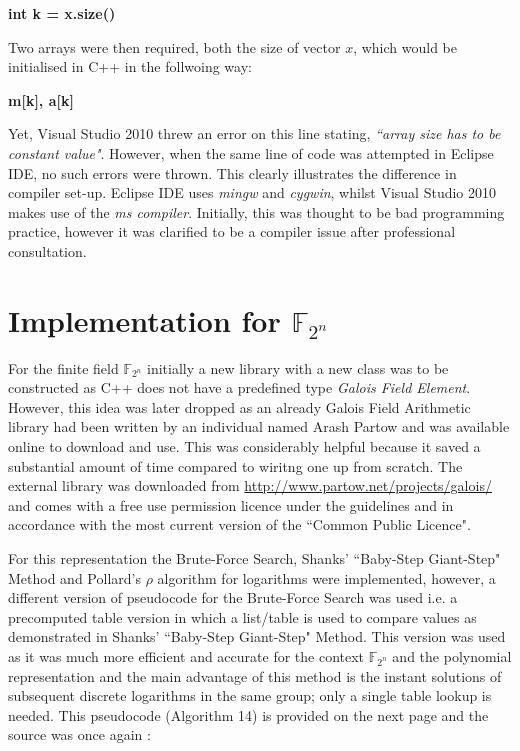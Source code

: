 \documentclass[iwp,first]{luthesis}
\begin{document}
\begin{center}

\textbf{int k = x.size()}

\end{center}

Two arrays were then required, both the size of vector $x$, which would be initialised in C++ in the follwoing way:

\begin{center}

\textbf{m[k], a[k]}

\end{center}

Yet, Visual Studio 2010 threw an error on this line stating, \textit{``array size has to be constant value"}. However, when the same line of code was attempted in Eclipse IDE, no such errors were thrown. This clearly illustrates the difference in compiler set-up. Eclipse IDE uses \textit{mingw} and \textit{cygwin}, whilst Visual Studio 2010 makes use of the \textit{ms compiler}. Initially, this was thought to be bad programming practice, however it was clarified to be a compiler issue after professional consultation.




\section{Implementation for $\mathbb{F}_{2^n}$}

For the finite field $\mathbb{F}_{2^n}$ initially a new library with a new class was to be constructed as C++ does not have a predefined type \textit{Galois Field Element}. However, this idea was later dropped as an already Galois Field Arithmetic library had been written by an individual named Arash Partow and was available online to download and use. This was considerably helpful because it saved a substantial amount of time compared to wiritng one up from scratch. The external library was downloaded from \url{http://www.partow.net/projects/galois/} and comes with a free use permission licence under the guidelines and in accordance with the most current version of the ``Common Public Licence".

For this representation the Brute-Force Search, Shanks' ``Baby-Step Giant-Step" Method and Pollard's $\rho$ algorithm for logarithms were implemented, however, a different version of pseudocode for the Brute-Force Search was used i.e. a precomputed table version in which a list/table is used to compare values as demonstrated in Shanks' ``Baby-Step Giant-Step" Method. This version was used as it was much more efficient and accurate for the context $\mathbb{F}_{2^n}$ and the polynomial representation and the main advantage of this method is the instant solutions of subsequent discrete logarithms in the same group; only a single table lookup is needed. This pseudocode (Algorithm 14) is provided on the next page and the source was once again \cite{MSc2}:
\end{document}
